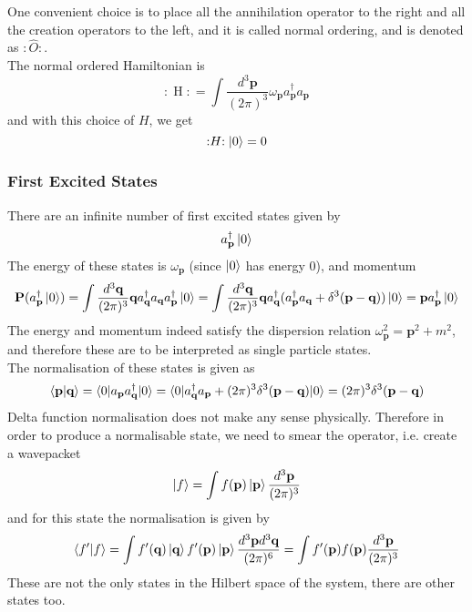 \documentclass[11pt, notitlepage]{report}
\newcommand{\w}{\omega}
\newcommand{\normord}[1]{:\mathrel{#1}:}
\numberwithin{equation}{section}
\begin{document}
    One convenient choice is to place all the annihilation operator to the right and all the creation operators to the left, and it is called normal ordering, and is denoted as \(\normord{\hat{O}}\). \\

    The normal ordered Hamiltonian is 
    \begin{equation}
        \normord{H} = \int \frac{d^3\textbf{p}}{(2\pi)^3} \w_\textbf{p} a^\dagger_\textbf{p} a_\textbf{p}
    \end{equation}
    and with this choice of \(H\), we get 
    \begin{equation*}
        \normord{H}\ket{0} = 0
    \end{equation*}
    
    \subsubsection{First Excited States} 
    There are an infinite number of first excited states given by 
    \begin{equation*}
        a^\dagger_\textbf{p}\ket{0}
    \end{equation*}
    The energy of these states is \(\w_\textbf{p}\) (since \(\ket{0}\) has energy 0), and momentum
    \begin{equation*}
        \textbf{P}(a^\dagger_\textbf{p}\ket{0}) = \int \frac{d^3\textbf{q}}{(2\pi)^3} \textbf{q}a^\dagger_\textbf{q}a_\textbf{q}a^\dagger_\textbf{p}\ket{0} = \int \frac{d^3\textbf{q}}{(2\pi)^3} \textbf{q}a^\dagger_\textbf{q}(a^\dagger_\textbf{p}a_\textbf{q} + \delta^3(\textbf{p} - \textbf{q}))\ket{0} = \textbf{p}a^\dagger_\textbf{p}\ket{0}
    \end{equation*}
    The energy and momentum indeed satisfy the dispersion relation \(\w_\textbf{p}^2 = \textbf{p}^2 + m^2\), and therefore these are to be interpreted as single particle states. \\

    The normalisation of these states is given as 
    \begin{equation}
        \braket{\textbf{p}|\textbf{q}} = \braket{0|a_\textbf{p}a^\dagger_\textbf{q}|0} = \braket{0|a^\dagger_\textbf{q}a_\textbf{p} + (2\pi)^3\delta^3(\textbf{p}-\textbf{q})|0} = (2\pi)^3\delta^3(\textbf{p}-\textbf{q})
    \end{equation}
    Delta function normalisation does not make any sense physically. Therefore in order to produce a normalisable state, we need to smear the operator, i.e. create a wavepacket
    \begin{equation*}
        \ket{f} = \int f(\textbf{p}) \ket{\textbf{p}} \frac{d^3\textbf{p}}{(2\pi)^3}
    \end{equation*}
    and for this state the normalisation is given by 
    \begin{equation*}
        \braket{f'|f} = \int f'(\textbf{q}) \ket{\textbf{q}} f'(\textbf{p}) \ket{\textbf{p}} \frac{d^3\textbf{p}d^3\textbf{q}}{(2\pi)^6} = \int f'(\textbf{p})f(\textbf{p}) \frac{d^3\textbf{p}}{(2\pi)^3}
    \end{equation*}
    These are not the only states in the Hilbert space of the system, there are other states too.
\end{document}
